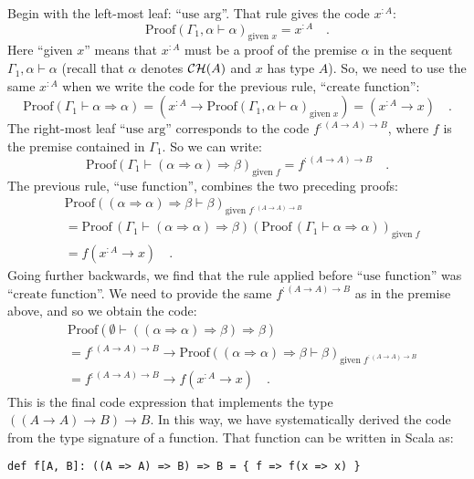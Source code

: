 Begin with the left-most leaf: \textsf{``}$\text{use arg}$\textsf{''}. That rule
gives the code $x^{:A}$:
\[
\text{Proof}\left(\Gamma_{1},\alpha\vdash\alpha\right)_{\text{given }x}=x^{:A}\quad.
\]
Here \textsf{``}given $x$\textsf{''} means that $x^{:A}$ must be a proof of the
premise $\alpha$ in the sequent $\Gamma_{1},\alpha\vdash\alpha$
(recall that $\alpha$ denotes ${\cal CH}(A)$ and $x$ has type $A$).
So, we need to use the same $x^{:A}$ when we write the code for the
previous rule, \textsf{``}$\text{create function}$\textsf{''}:
\[
\text{Proof}\left(\Gamma_{1}\vdash\alpha\Rightarrow\alpha\right)=(x^{:A}\rightarrow\text{Proof}\left(\Gamma_{1},\alpha\vdash\alpha\right)_{\text{given }x})=(x^{:A}\rightarrow x)\quad.
\]
The right-most leaf \textsf{``}$\text{use arg}$\textsf{''} corresponds to the code
$f^{:(A\rightarrow A)\rightarrow B}$, where $f$ is the premise contained
in $\Gamma_{1}$. So we can write:
\[
\text{Proof}\left(\Gamma_{1}\vdash(\alpha\Rightarrow\alpha)\Rightarrow\beta\right)_{\text{given }f}=f^{:(A\rightarrow A)\rightarrow B}\quad.
\]
The previous rule, \textsf{``}$\text{use function}$\textsf{''}, combines the two
preceding proofs:
\begin{align*}
 & \text{Proof}\left((\alpha\Rightarrow\alpha)\Rightarrow\beta\vdash\beta\right)_{\text{given }f^{:\left(A\rightarrow A\right)\rightarrow B}}\\
 & =\text{Proof}\,(\Gamma_{1}\vdash(\alpha\Rightarrow\alpha)\Rightarrow\beta)\left(\text{Proof}\,(\Gamma_{1}\vdash\alpha\Rightarrow\alpha)\right)_{\text{given }f}\\
 & =f(x^{:A}\rightarrow x)\quad.
\end{align*}
Going further backwards, we find that the rule applied before \textsf{``}$\text{use function}$\textsf{''}
was \textsf{``}$\text{create function}$\textsf{''}. We need to provide the same $f^{:\left(A\rightarrow A\right)\rightarrow B}$
as in the premise above, and so we obtain the code:
\begin{align*}
 & \text{Proof}\left(\emptyset\vdash((\alpha\Rightarrow\alpha)\Rightarrow\beta)\Rightarrow\beta\right)\\
 & =f^{:\left(A\rightarrow A\right)\rightarrow B}\rightarrow\text{Proof}\left((\alpha\Rightarrow\alpha)\Rightarrow\beta\vdash\beta\right)_{\text{given }f^{:\left(A\rightarrow A\right)\rightarrow B}}\\
 & =f^{:\left(A\rightarrow A\right)\rightarrow B}\rightarrow f(x^{:A}\rightarrow x)\quad.
\end{align*}
This is the final code expression that implements the type $((A\rightarrow A)\rightarrow B)\rightarrow B$.
In this way, we have systematically derived the code from the type
signature of a function. That function can be written in Scala as:
\begin{lstlisting}
def f[A, B]: ((A => A) => B) => B = { f => f(x => x) }
\end{lstlisting}


